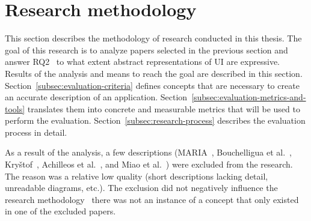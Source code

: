 \section{Research methodology}\label{sec:research-methodology}

This section describes the methodology of research conducted in this thesis.
The goal of this research is to analyze papers selected in the previous section and answer RQ2 \textendash\ to what extent abstract representations of UI are expressive.
Results of the analysis and means to reach the goal are described in this section.
Section~\ref{subsec:evaluation-criteria} defines concepts that are necessary to create an accurate description of an application.
Section~\ref{subsec:evaluation-metrics-and-tools} translates them into concrete and measurable metrics that will be used to perform the evaluation.
Section~\ref{subsec:research-process} describes the evaluation process in detail.

As a result of the analysis, a few descriptions (MARIA~\cite{Paterno2009, MariaPDF}, Bouchelligua et al.~\cite{Bouchelligua2010}, Kryštof~\cite{kryvstof2010lpgm}, Achilleos et al.~\cite{Achilleos2011}, and Miao et al.~\cite{Miao2017}) were excluded from the research.
The reason was a relative low quality (short descriptions lacking detail, unreadable diagrams, etc.).
The exclusion did not negatively influence the research methodology \textendash\ there was not an instance of a concept that only existed in one of the excluded papers.




